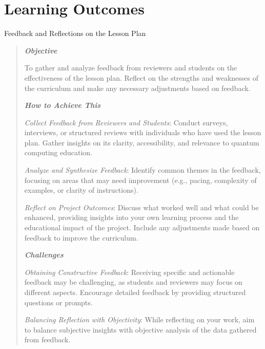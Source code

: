 \section{Learning Outcomes}

Feedback and Reflections on the Lesson Plan

\begin{quote}\itshape
\textbf{\emph{Objective}}

To gather and analyze feedback from reviewers and students on the effectiveness of the lesson plan. 
Reflect on the strengths and weaknesses of the curriculum and make any necessary adjustments based on feedback.

\textbf{\emph{How to Achieve This}}

\emph{Collect Feedback from Reviewers and Students}: Conduct surveys, interviews, or structured reviews with individuals who have used the lesson plan. 
Gather insights on its clarity, accessibility, and relevance to quantum computing education.

\emph{Analyze and Synthesize Feedback}: Identify common themes in the feedback, focusing on areas that may need improvement 
(e.g., pacing, complexity of examples, or clarity of instructions).

\emph{Reflect on Project Outcomes}: Discuss what worked well and what could be enhanced, providing insights into your 
own learning process and the educational impact of the project. Include any adjustments made based on feedback to improve the curriculum.

\textbf{\emph{Challenges}}

\emph{Obtaining Constructive Feedback}: Receiving specific and actionable feedback may be challenging, as students and 
reviewers may focus on different aspects. Encourage detailed feedback by providing structured questions or prompts.

\emph{Balancing Reflection with Objectivity}: While reflecting on your work, aim to balance subjective insights with 
objective analysis of the data gathered from feedback.
\end{quote}\ignorespacesafterend
    
